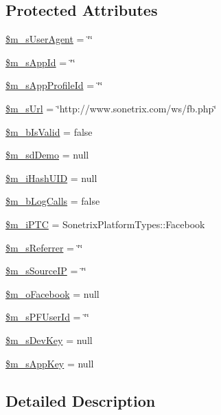 \subsection*{Protected Attributes}
\begin{DoxyCompactItemize}
\item 
\hyperlink{classSonetrixClient_afd680e0c3a487e8558cd5ad9d1cb0611}{\$m\_\-sUserAgent} = \char`\"{}\char`\"{}
\item 
\hyperlink{classSonetrixClient_acd79de47be3cc9eb08fa4190b5d8a8bb}{\$m\_\-sAppId} = \char`\"{}\char`\"{}
\item 
\hyperlink{classSonetrixClient_a24e788d955d13e6906581754ac15bd6b}{\$m\_\-sAppProfileId} = \char`\"{}\char`\"{}
\item 
\hyperlink{classSonetrixClient_ab16efc62694fc7d6620d2f951db167ac}{\$m\_\-sUrl} = \char`\"{}http://www.sonetrix.com/ws/fb.php\char`\"{}
\item 
\hyperlink{classSonetrixClient_ab06d5fc246adce3ed8bb29dc52bcdd0e}{\$m\_\-bIsValid} = false
\item 
\hyperlink{classSonetrixClient_a61a6667d5f1e9f48e90a0fc603c20be0}{\$m\_\-sdDemo} = null
\item 
\hyperlink{classSonetrixClient_a3832cbb70bb294d8f8800acdb598abe1}{\$m\_\-iHashUID} = null
\item 
\hyperlink{classSonetrixClient_a2f73148a503cb4a30acce7c8c1b48753}{\$m\_\-bLogCalls} = false
\item 
\hyperlink{classSonetrixClient_ab294fcb3988981bf2d504f3f3b07dd99}{\$m\_\-iPTC} = SonetrixPlatformTypes::Facebook
\item 
\hyperlink{classSonetrixClient_a251ed856d45aa28d717a012291b71d26}{\$m\_\-sReferrer} = \char`\"{}\char`\"{}
\item 
\hyperlink{classSonetrixClient_a18f4e0dc2a0b958c79a301411d4be3db}{\$m\_\-sSourceIP} = \char`\"{}\char`\"{}
\item 
\hyperlink{classSonetrixClient_a664f01f92cfc167d1219ec19e9451dbb}{\$m\_\-oFacebook} = null
\item 
\hyperlink{classSonetrixClient_aca2665de105ba9e1a89b58722bd21f16}{\$m\_\-sPFUserId} = \char`\"{}\char`\"{}
\item 
\hyperlink{classSonetrixClient_a83e31531b8c35eca0840ad9bb8d07645}{\$m\_\-sDevKey} = null
\item 
\hyperlink{classSonetrixClient_aeba89a380900e90bdfe18c08bf057a13}{\$m\_\-sAppKey} = null
\end{DoxyCompactItemize}


\subsection{Detailed Description}


